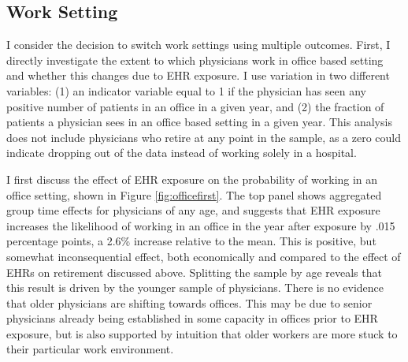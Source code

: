 \documentclass[11pt]{article}
\begin{document}
\subsection{Work Setting}

 I consider the decision to switch work settings using multiple outcomes. First, I directly investigate the extent to which physicians work in office based setting and whether this changes due to EHR exposure. I use variation in two different variables: (1) an indicator variable equal to 1 if the physician has seen any positive number of patients in an office in a given year, and (2) the fraction of patients a physician sees in an office based setting in a given year. This analysis does not include physicians who retire at any point in the sample, as a zero could indicate dropping out of the data instead of working solely in a hospital. 

I first discuss the effect of EHR exposure on the probability of working in an office setting, shown in Figure \ref{fig:officefirst}. The top panel shows aggregated group time effects for physicians of any age, and suggests that EHR exposure increases the likelihood of working in an office in the year after exposure by .015 percentage points, a 2.6\% increase relative to the mean. This is positive, but somewhat inconsequential effect, both economically and compared to the effect of EHRs on retirement discussed above. Splitting the sample by age reveals that this result is driven by the younger sample of physicians. There is no evidence that older physicians are shifting towards offices. This may be due to senior physicians already being established in some capacity in offices prior to EHR exposure, but is also supported by intuition that older workers are more stuck to their particular work environment.
\end{document}

